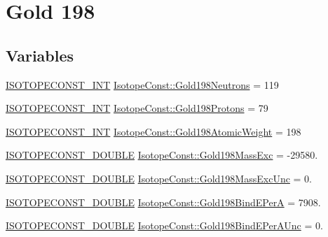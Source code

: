 \hypertarget{group___isotope_const-_gold-_au198}{}\section{Gold 198}
\label{group___isotope_const-_gold-_au198}
\subsection*{Variables}
\begin{DoxyCompactItemize}
\item 
\mbox{\hyperlink{group___isotope_const-_macros_ga5f18360b3e99483a35c32d789e62621c}{I\+S\+O\+T\+O\+P\+E\+C\+O\+N\+S\+T\+\_\+\+I\+NT}} \mbox{\hyperlink{group___isotope_const-_gold-_au198_ga60de7b2838df380588cb586826dc7e8a}{Isotope\+Const\+::\+Gold198\+Neutrons}} = 119
\item 
\mbox{\hyperlink{group___isotope_const-_macros_ga5f18360b3e99483a35c32d789e62621c}{I\+S\+O\+T\+O\+P\+E\+C\+O\+N\+S\+T\+\_\+\+I\+NT}} \mbox{\hyperlink{group___isotope_const-_gold-_au198_gae366557ba751f9f2e8c9edd9865998e2}{Isotope\+Const\+::\+Gold198\+Protons}} = 79
\item 
\mbox{\hyperlink{group___isotope_const-_macros_ga5f18360b3e99483a35c32d789e62621c}{I\+S\+O\+T\+O\+P\+E\+C\+O\+N\+S\+T\+\_\+\+I\+NT}} \mbox{\hyperlink{group___isotope_const-_gold-_au198_gacca4f14518a42292e72512772fc22685}{Isotope\+Const\+::\+Gold198\+Atomic\+Weight}} = 198
\item 
\mbox{\hyperlink{group___isotope_const-_macros_ga8f45a7272ce02c0b4c65c44636ed719a}{I\+S\+O\+T\+O\+P\+E\+C\+O\+N\+S\+T\+\_\+\+D\+O\+U\+B\+LE}} \mbox{\hyperlink{group___isotope_const-_gold-_au198_ga2f6c819ee80c10bb7496d5ac90dd4c45}{Isotope\+Const\+::\+Gold198\+Mass\+Exc}} = -\/29580.
\item 
\mbox{\hyperlink{group___isotope_const-_macros_ga8f45a7272ce02c0b4c65c44636ed719a}{I\+S\+O\+T\+O\+P\+E\+C\+O\+N\+S\+T\+\_\+\+D\+O\+U\+B\+LE}} \mbox{\hyperlink{group___isotope_const-_gold-_au198_ga5e8af106b28537058d67857cc67555ed}{Isotope\+Const\+::\+Gold198\+Mass\+Exc\+Unc}} = 0.
\item 
\mbox{\hyperlink{group___isotope_const-_macros_ga8f45a7272ce02c0b4c65c44636ed719a}{I\+S\+O\+T\+O\+P\+E\+C\+O\+N\+S\+T\+\_\+\+D\+O\+U\+B\+LE}} \mbox{\hyperlink{group___isotope_const-_gold-_au198_ga2f324c759367692641c22c6054acd054}{Isotope\+Const\+::\+Gold198\+Bind\+E\+PerA}} = 7908.
\item 
\mbox{\hyperlink{group___isotope_const-_macros_ga8f45a7272ce02c0b4c65c44636ed719a}{I\+S\+O\+T\+O\+P\+E\+C\+O\+N\+S\+T\+\_\+\+D\+O\+U\+B\+LE}} \mbox{\hyperlink{group___isotope_const-_gold-_au198_ga61fe9aca78cf993375089478424e1aba}{Isotope\+Const\+::\+Gold198\+Bind\+E\+Per\+A\+Unc}} = 0.

\end{DoxyCompactItemize}
